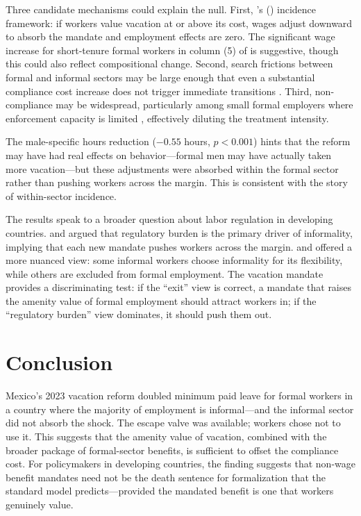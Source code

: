 \documentclass[12pt]{article}
\begin{document}
Three candidate mechanisms could explain the null. First, \citeauthor{summers1989}'s (\citeyear{summers1989}) incidence framework: if workers value vacation at or above its cost, wages adjust downward to absorb the mandate and employment effects are zero. The significant wage increase for short-tenure formal workers in column (5) of  is suggestive, though this could also reflect compositional change. Second, search frictions between formal and informal sectors may be large enough that even a substantial compliance cost increase does not trigger immediate transitions \citep{bobba2021, meghir2015}. Third, non-compliance may be widespread, particularly among small formal employers where enforcement capacity is limited \citep{almeida2012}, effectively diluting the treatment intensity.

The male-specific hours reduction ($-0.55$ hours, $p < 0.001$) hints that the reform may have had real effects on behavior---formal men may have actually taken more vacation---but these adjustments were absorbed within the formal sector rather than pushing workers across the margin. This is consistent with the \citet{gruber1994} story of within-sector incidence.

The results speak to a broader question about labor regulation in developing countries. \citet{de_soto1989} and \citet{loayza1996} argued that regulatory burden is the primary driver of informality, implying that each new mandate pushes workers across the margin. \citet{maloney2004} and \citet{perry2007} offered a more nuanced view: some informal workers choose informality for its flexibility, while others are excluded from formal employment. The vacation mandate provides a discriminating test: if the ``exit'' view is correct, a mandate that raises the amenity value of formal employment should attract workers in; if the ``regulatory burden'' view dominates, it should push them out.

\section{Conclusion}

Mexico's 2023 vacation reform doubled minimum paid leave for formal workers in a country where the majority of employment is informal---and the informal sector did not absorb the shock. The escape valve was available; workers chose not to use it. This suggests that the amenity value of vacation, combined with the broader package of formal-sector benefits, is sufficient to offset the compliance cost. For policymakers in developing countries, the finding suggests that non-wage benefit mandates need not be the death sentence for formalization that the standard model predicts---provided the mandated benefit is one that workers genuinely value.
\end{document}
